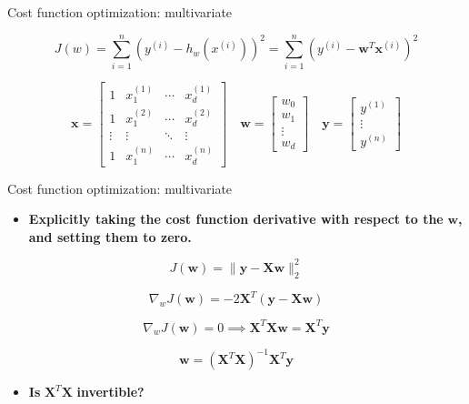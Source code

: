 \documentclass[serif, aspectratio=169]{beamer}
\begin{document}
\begin{frame}{Cost function optimization: multivariate}

\[
J(w) = \sum_{i=1}^{n} \left( y^{(i)} - h_w(x^{(i)}) \right)^2 = \sum_{i=1}^{n} \left( y^{(i)} - \mathbf{w}^T \mathbf{x}^{(i)} \right)^2
\]

\[
\mathbf{x} =
\begin{bmatrix}
1 & x_1^{(1)} & \cdots & x_d^{(1)} \\
1 & x_1^{(2)} & \cdots & x_d^{(2)} \\
\vdots & \vdots & \ddots & \vdots \\
1 & x_1^{(n)} & \cdots & x_d^{(n)}
\end{bmatrix}
\quad
\mathbf{w} =
\begin{bmatrix}
w_0 \\
w_1 \\
\vdots \\
w_d
\end{bmatrix}
\quad
\mathbf{y} =
\begin{bmatrix}
y^{(1)} \\
\vdots \\
y^{(n)}
\end{bmatrix}
\]

\end{frame}

\begin{frame}{Cost function optimization: multivariate}

\begin{itemize}
    \item \textbf{Explicitly taking the cost function derivative with respect to the} \( \mathbf{w} \)\textbf{, and setting them to zero.}
\end{itemize}

\[
J(\mathbf{w}) = \| \mathbf{y} - \mathbf{Xw} \|_2^2
\]

\[
\nabla_w J(\mathbf{w}) = -2 \mathbf{X}^T \left( \mathbf{y} - \mathbf{Xw} \right)
\]

\[
\nabla_w J(\mathbf{w}) = 0 \implies \mathbf{X}^T \mathbf{Xw} = \mathbf{X}^T \mathbf{y}
\]

\[
\mathbf{w} = \left( \mathbf{X}^T \mathbf{X} \right)^{-1} \mathbf{X}^T \mathbf{y}
\]

\begin{itemize}
    \item \textbf{Is} \( \mathbf{X}^T \mathbf{X} \) \textbf{invertible?}
\end{itemize}

\end{frame}
\end{document}
